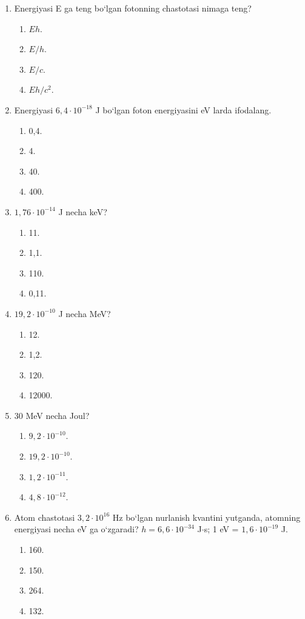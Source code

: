 \begin{enumerate}
\item Energiyasi E ga teng bo‘lgan fotonning chastotasi nimaga teng?
\begin{enumerate}[label=\Alph*)]
\item $Eh$.
\item $E/h$.
\item $E/c$.
\item $Eh/c^2$.
\end{enumerate}

\item Energiyasi $6,4\cdot 10^{-18}$ J bo‘lgan foton energiyasini eV larda ifodalang.
\begin{enumerate}[label=\Alph*)]
\item 0,4.
\item 4.
\item 40.
\item 400.
\end{enumerate}

\item $1,76\cdot 10^{-14}$ J necha keV?
\begin{enumerate}[label=\Alph*)]
\item 11.
\item 1,1.
\item 110.
\item 0,11.
\end{enumerate}

\item $19,2\cdot 10^{-10}$ J necha MeV?
\begin{enumerate}[label=\Alph*)]
\item 12.
\item 1,2.
\item 120.
\item 12000.
\end{enumerate}

\item 30 MeV necha Joul?
\begin{enumerate}[label=\Alph*)]
\item $9,2\cdot 10^{-10}$.
\item $19,2\cdot 10^{-10}$.
\item $1,2\cdot 10^{-11}$.
\item $4,8\cdot 10^{-12}$.
\end{enumerate}

\item Atom chastotasi $3,2\cdot 10^{16}$ Hz bo‘lgan nurlanish kvantini yutganda, atomning energiyasi necha eV ga o‘zgaradi? $h = 6,6\cdot 10^{-34}$ J$\cdot$s; 1 eV = $1,6\cdot 10^{-19}$ J.
\begin{enumerate}[label=\Alph*)]
\item 160.
\item 150.
\item 264.
\item 132.
\end{enumerate}


\end{enumerate}
